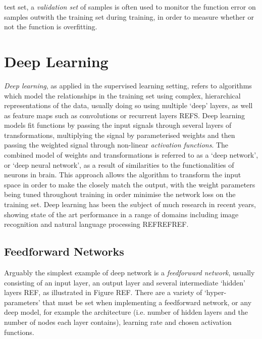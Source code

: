 test set, a \textit{validation set} of samples is often used to monitor the function error on samples outwith the training set during training, in order to measure whether or not the function is overfitting. 

\section{Deep Learning}
\textit{Deep learning}, as applied in the supervised learning setting, refers to algorithms which model the relationships in the training set using complex, hierarchical representations of the data, usually doing so using multiple `deep' layers, as well as feature maps such as convolutions or recurrent layers REFS. Deep learning models fit functions by passing the input signals through several layers of transformations, multiplying the signal by parameterised weights and then passing the weighted signal through non-linear \textit{activation functions}. The combined model of weights and transformations is referred to as a `deep network', or `deep neural network', as a result of similarities to the functionalities of neurons in brain. This approach allows the algorithm to transform the input space in order to make the closely match the output, with the weight parameters being tuned throughout training in order minimise the network loss on the training set. Deep learning has been the subject of much research in recent years, showing state of the art performance in a range of domains including image recognition and natural language processing REFREFREF.
\subsection{Feedforward Networks}
Arguably the simplest example of deep network is a \textit{feedforward network}, usually consisting of an input layer, an output layer and several intermediate `hidden' layers REF, as illustrated in Figure REF. There are a variety of `hyper-parameters' that must be set when implementing a feedforward network, or any deep model, for example the architecture (i.e. number of hidden layers and the number of nodes each layer contains), learning rate and chosen activation functions.

